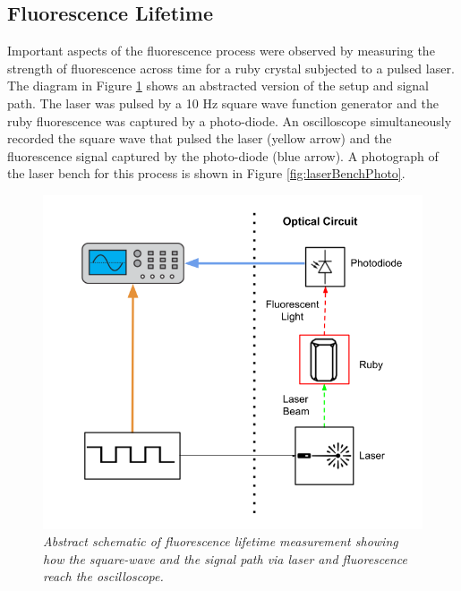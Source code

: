 \documentclass[11pt, a4paper, twocolumn]{article}
\begin{document}
\subsection*{Fluorescence Lifetime}
Important aspects of the fluorescence process were observed by measuring the strength of fluorescence across time for a ruby crystal subjected to a pulsed laser. The diagram in Figure \ref{fig:decayMeasurementSchematic} shows an abstracted version of the setup and signal path. The laser was pulsed by a 10 Hz square wave function generator and the ruby fluorescence was captured by a photo-diode. An oscilloscope simultaneously recorded the square wave that pulsed the laser (yellow arrow) and the fluorescence signal captured by the photo-diode (blue arrow). A photograph of the laser bench for this process is shown in Figure \ref{fig:laserBenchPhoto}.
\begin{figure}[]
\includegraphics[width=\linewidth]{decayMeasurementSchematic.png}
\caption{\textit{Abstract schematic of fluorescence lifetime measurement showing how the square-wave and the signal path via laser and fluorescence reach the oscilloscope.}}
\label{fig:decayMeasurementSchematic}
\end{figure}
\end{document}
